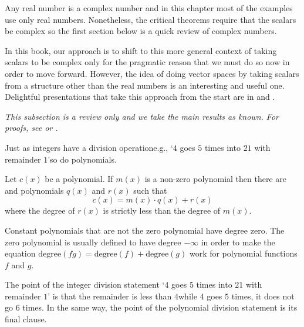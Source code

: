 Any real number is a complex number and
in this chapter most of the examples use
only real numbers.
Nonetheless, the critical theorems require that the scalars be complex so
the first section below is a quick review of complex numbers.

In this book, our approach is to shift to this more general context 
of taking scalars to be complex only for the 
pragmatic reason that we must do so now in order to 
move forward.
However, the idea of doing vector spaces 
by taking scalars from a structure other than the real
numbers is an interesting and useful one.
Delightful presentations that take this approach from the start are in
\cite{Halmos} and \cite{HoffmanKunze}.






\textit{
  This subsection is a review only and we take the main results as known.
  For proofs, see \cite{BirkhoffMaclane} or \cite{Ebbinghaus}.}

Just as integers have a division operation\Dash e.g., 
`\( 4 \) goes \( 5 \) times into \( 21 \) with remainder \( 1 \)'\Dash so 
do polynomials.

\begin{theorem}
\label{th:EuclidForPolys}
Let \( c(x) \) be a polynomial.
If \( m(x) \) is a non-zero polynomial then there are  and
 polynomials \( q(x) \) and \( r(x) \) such that
\begin{equation*}
  c(x)=m(x)\cdot q(x)+r(x)
\end{equation*}
where the degree of \( r(x) \) is strictly less than the degree of \( m(x) \).
\end{theorem}

\begin{remark}
Constant polynomials that are not the zero polynomial have degree zero.
The zero polynomial is usually defined to have degree 
$-\infty$ in order to make 
the equation $\text{degree}(fg)=\text{degree}(f)+\text{degree}(g)$
work for polynomial functions $f$ and $g$. 
\end{remark}

The point of the integer division statement
`\( 4 \) goes \( 5 \) times into \( 21 \) with remainder \( 1 \)'
is that the remainder is less than \( 4 \)\Dash while \( 4 \) goes \( 5 \)
times, it does not go \( 6 \) times.
In the same way, the point of the polynomial division statement
is its final clause.

